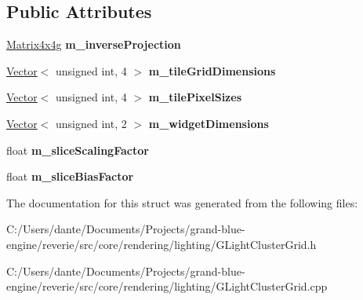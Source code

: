 \subsection*{Public Attributes}
\begin{DoxyCompactItemize}
\item 
\mbox{\label{structrev_1_1_light_cluster_grid_1_1_screen_to_view_a639b3e7bf913a6e241ccc332bd48bbce}} 
\mbox{\hyperlink{classrev_1_1_square_matrix}{Matrix4x4g}} {\bfseries m\+\_\+inverse\+Projection}
\item 
\mbox{\label{structrev_1_1_light_cluster_grid_1_1_screen_to_view_a26af643937192107c59bf7025698ff43}} 
\mbox{\hyperlink{classrev_1_1_vector}{Vector}}$<$ unsigned int, 4 $>$ {\bfseries m\+\_\+tile\+Grid\+Dimensions}
\item 
\mbox{\label{structrev_1_1_light_cluster_grid_1_1_screen_to_view_a675c256086c4c6a1d45ce25698766b99}} 
\mbox{\hyperlink{classrev_1_1_vector}{Vector}}$<$ unsigned int, 4 $>$ {\bfseries m\+\_\+tile\+Pixel\+Sizes}
\item 
\mbox{\label{structrev_1_1_light_cluster_grid_1_1_screen_to_view_a28e61c273371c5eead2d2d314b2f4a2e}} 
\mbox{\hyperlink{classrev_1_1_vector}{Vector}}$<$ unsigned int, 2 $>$ {\bfseries m\+\_\+widget\+Dimensions}
\item 
\mbox{\label{structrev_1_1_light_cluster_grid_1_1_screen_to_view_ad65e3335d27a770d3e35b8b01a1e5806}} 
float {\bfseries m\+\_\+slice\+Scaling\+Factor}
\item 
\mbox{\label{structrev_1_1_light_cluster_grid_1_1_screen_to_view_a5a4b737888ba0d79538ff4ed4593c856}} 
float {\bfseries m\+\_\+slice\+Bias\+Factor}
\end{DoxyCompactItemize}


The documentation for this struct was generated from the following files\+:\begin{DoxyCompactItemize}
\item 
C\+:/\+Users/dante/\+Documents/\+Projects/grand-\/blue-\/engine/reverie/src/core/rendering/lighting/G\+Light\+Cluster\+Grid.\+h\item 
C\+:/\+Users/dante/\+Documents/\+Projects/grand-\/blue-\/engine/reverie/src/core/rendering/lighting/G\+Light\+Cluster\+Grid.\+cpp\end{DoxyCompactItemize}
